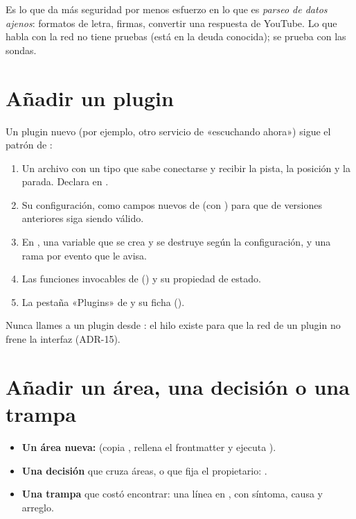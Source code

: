 Es lo que da más seguridad por menos esfuerzo en lo que es \emph{parseo de datos ajenos}:
formatos de letra, firmas, convertir una respuesta de YouTube. Lo que habla con la red no tiene
pruebas (está en la deuda conocida); se prueba con las sondas.

\section{Añadir un plugin}

Un plugin nuevo (por ejemplo, otro servicio de «escuchando ahora») sigue el patrón de
:

\begin{enumerate}
  \item Un archivo  con un tipo que sabe conectarse y recibir
  la pista, la posición y la parada. Declara  en .
  \item Su configuración, como campos nuevos de  (con ) para
  que  de versiones anteriores siga siendo válido.
  \item En , una variable  que se crea y se destruye según la
  configuración, y una rama por evento que le avisa.
  \item Las funciones invocables de  () y su propiedad de estado.
  \item La pestaña «Plugins» de  y su ficha
  ().
\end{enumerate}

Nunca llames a un plugin desde : el hilo  existe para que la red de un
plugin no frene la interfaz (ADR-15).

\section{Añadir un área, una decisión o una trampa}

\begin{itemize}
  \item \textbf{Un área nueva:}  (copia
  , rellena el frontmatter y ejecuta
  ).
  \item \textbf{Una decisión} que cruza áreas, o que fija el propietario:
  .
  \item \textbf{Una trampa} que costó encontrar: una línea en , con
  síntoma, causa y arreglo.
\end{itemize}

